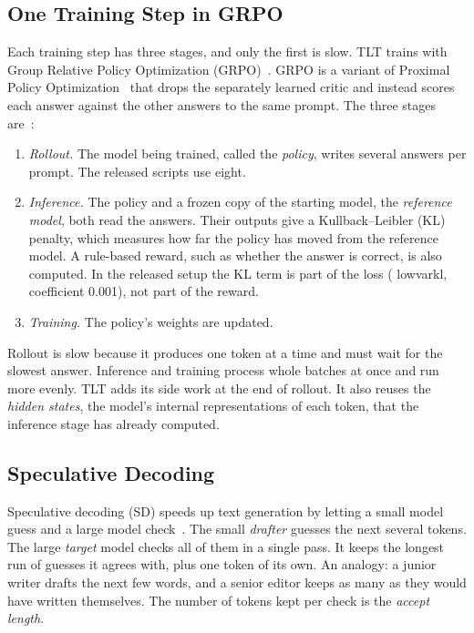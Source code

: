 \documentclass[conference]{IEEEtran}
\newcommand{\brkus}{\textunderscore\allowbreak}
\newcommand{\code}[1]{{\small\ttfamily\let\_\brkus\hyphenchar\font=-1 #1}}
\begin{document}
\subsection{One Training Step in GRPO}
Each training step has three stages, and only the first is slow. TLT trains with Group Relative Policy Optimization (GRPO)~\cite{shao2024deepseekmath}. GRPO is a variant of Proximal Policy Optimization~\cite{schulman2017ppo} that drops the separately learned critic and instead scores each answer against the other answers to the same prompt. The three stages are~\cite[Sec.~2.1, Fig.~4]{hu2026tlt}:
\begin{enumerate}
\item \emph{Rollout.} The model being trained, called the \emph{policy}, writes several answers per prompt. The released scripts use eight.
\item \emph{Inference.} The policy and a frozen copy of the starting model, the \emph{reference model}, both read the answers. Their outputs give a Kullback--Leibler (KL) penalty, which measures how far the policy has moved from the reference model. A rule-based reward, such as whether the answer is correct, is also computed. In the released setup the KL term is part of the loss (\code{low\_var\_kl}, coefficient 0.001), not part of the reward.
\item \emph{Training.} The policy's weights are updated.
\end{enumerate}
Rollout is slow because it produces one token at a time and must wait for the slowest answer. Inference and training process whole batches at once and run more evenly. TLT adds its side work at the end of rollout. It also reuses the \emph{hidden states}, the model's internal representations of each token, that the inference stage has already computed.

\subsection{Speculative Decoding}
Speculative decoding (SD) speeds up text generation by letting a small model guess and a large model check~\cite{leviathan2023,chen2023}. The small \emph{drafter} guesses the next several tokens. The large \emph{target} model checks all of them in a single pass. It keeps the longest run of guesses it agrees with, plus one token of its own. An analogy: a junior writer drafts the next few words, and a senior editor keeps as many as they would have written themselves. The number of tokens kept per check is the \emph{accept length}.
\end{document}
